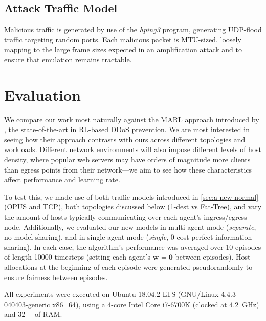 \documentclass[10pt, times, conference, letterpaper]{IEEEtran}
\newcommand{\wvec}[1]{\ensuremath{\bm{w}_{#1}}}
\begin{document}
\subsection{Attack Traffic Model}
Malicious traffic is generated by use of the \emph{hping3} program, generating UDP-flood traffic targeting random ports.
Each malicious packet is MTU-sized, loosely mapping to the large frame sizes expected in an amplification attack and to ensure that emulation remains tractable.

\section{Evaluation}


We compare our work most naturally against the MARL approach introduced by \textcite{DBLP:journals/eaai/MalialisK15}, the state-of-the-art in RL-based DDoS prevention.
We are most interested in seeing how their approach contrasts with ours across different topologies and workloads.
Different network environments will also impose different levels of host density, where popular web servers may have orders of magnitude more clients than egress points from their network---we aim to see how these characteristics affect performance and learning rate.

To test this, we made use of both traffic models introduced in \cref{sec:a-new-normal} (OPUS and TCP), both topologies discussed below (1-dest vs Fat-Tree), and vary the amount of hosts typically communicating over each agent's ingress/egress node.
Additionally, we evaluated our new models in multi-agent mode (\emph{separate}, no model sharing), and in single-agent mode (\emph{single}, 0-cost perfect information sharing).
In each case, the algorithm's performance was averaged over \num{10} episodes of length \num{10000} timesteps (setting each agent's $\wvec{}=\bm{0}$ between episodes).
Host allocations at the beginning of each episode were generated pseudorandomly to ensure fairness between episodes.

All experiments were executed on Ubuntu 18.04.2 LTS (GNU/Linux 4.4.3-040403-generic x86\_64), using a 4-core Intel Core i7-6700K (clocked at \SI{4.2}{\giga\hertz}) and \SI{32}{\gibi\byte} of RAM.
\end{document}
